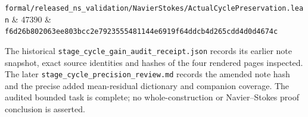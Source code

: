 \documentclass[10pt,a4paper]{article}
\begin{document}
{\begin{longtable}[]
\texttt{f\allowbreak{}o\allowbreak{}r\allowbreak{}m\allowbreak{}a\allowbreak{}l\allowbreak{}/\allowbreak{}r\allowbreak{}e\allowbreak{}l\allowbreak{}e\allowbreak{}a\allowbreak{}s\allowbreak{}e\allowbreak{}d\allowbreak{}\_\allowbreak{}n\allowbreak{}s\allowbreak{}\_\allowbreak{}v\allowbreak{}a\allowbreak{}l\allowbreak{}i\allowbreak{}d\allowbreak{}a\allowbreak{}t\allowbreak{}i\allowbreak{}o\allowbreak{}n\allowbreak{}/\allowbreak{}N\allowbreak{}a\allowbreak{}v\allowbreak{}i\allowbreak{}e\allowbreak{}r\allowbreak{}S\allowbreak{}t\allowbreak{}o\allowbreak{}k\allowbreak{}e\allowbreak{}s\allowbreak{}/\allowbreak{}A\allowbreak{}c\allowbreak{}t\allowbreak{}u\allowbreak{}a\allowbreak{}l\allowbreak{}C\allowbreak{}y\allowbreak{}c\allowbreak{}l\allowbreak{}e\allowbreak{}P\allowbreak{}r\allowbreak{}e\allowbreak{}s\allowbreak{}e\allowbreak{}r\allowbreak{}v\allowbreak{}a\allowbreak{}t\allowbreak{}i\allowbreak{}o\allowbreak{}n\allowbreak{}.\allowbreak{}l\allowbreak{}e\allowbreak{}a\allowbreak{}n} & {}47390 & \texttt{f\allowbreak{}6\allowbreak{}d\allowbreak{}2\allowbreak{}6\allowbreak{}b\allowbreak{}8\allowbreak{}0\allowbreak{}2\allowbreak{}0\allowbreak{}6\allowbreak{}3\allowbreak{}e\allowbreak{}e\allowbreak{}8\allowbreak{}0\allowbreak{}3\allowbreak{}b\allowbreak{}c\allowbreak{}c\allowbreak{}2\allowbreak{}e\allowbreak{}7\allowbreak{}9\allowbreak{}2\allowbreak{}3\allowbreak{}5\allowbreak{}5\allowbreak{}5\allowbreak{}4\allowbreak{}8\allowbreak{}1\allowbreak{}1\allowbreak{}4\allowbreak{}4\allowbreak{}e\allowbreak{}6\allowbreak{}9\allowbreak{}1\allowbreak{}9\allowbreak{}f\allowbreak{}6\allowbreak{}4\allowbreak{}d\allowbreak{}d\allowbreak{}c\allowbreak{}b\allowbreak{}4\allowbreak{}d\allowbreak{}2\allowbreak{}6\allowbreak{}5\allowbreak{}c\allowbreak{}d\allowbreak{}d\allowbreak{}4\allowbreak{}d\allowbreak{}0\allowbreak{}d\allowbreak{}4\allowbreak{}6\allowbreak{}7\allowbreak{}4\allowbreak{}c} \\
\end{longtable}
}

The historical \texttt{s\allowbreak{}t\allowbreak{}a\allowbreak{}g\allowbreak{}e\allowbreak{}\_\allowbreak{}c\allowbreak{}y\allowbreak{}c\allowbreak{}l\allowbreak{}e\allowbreak{}\_\allowbreak{}g\allowbreak{}a\allowbreak{}i\allowbreak{}n\allowbreak{}\_\allowbreak{}a\allowbreak{}u\allowbreak{}d\allowbreak{}i\allowbreak{}t\allowbreak{}\_\allowbreak{}r\allowbreak{}e\allowbreak{}c\allowbreak{}e\allowbreak{}i\allowbreak{}p\allowbreak{}t\allowbreak{}.\allowbreak{}j\allowbreak{}s\allowbreak{}o\allowbreak{}n} records its earlier note snapshot, exact source identities and hashes of the four rendered pages inspected. The later \texttt{s\allowbreak{}t\allowbreak{}a\allowbreak{}g\allowbreak{}e\allowbreak{}\_\allowbreak{}c\allowbreak{}y\allowbreak{}c\allowbreak{}l\allowbreak{}e\allowbreak{}\_\allowbreak{}p\allowbreak{}r\allowbreak{}e\allowbreak{}c\allowbreak{}i\allowbreak{}s\allowbreak{}i\allowbreak{}o\allowbreak{}n\allowbreak{}\_\allowbreak{}r\allowbreak{}e\allowbreak{}v\allowbreak{}i\allowbreak{}e\allowbreak{}w\allowbreak{}.\allowbreak{}m\allowbreak{}d} records the amended note hash and the precise added mean-residual dictionary and companion coverage. The audited bounded task is complete; no whole-construction or Navier--Stokes proof conclusion is asserted.
\end{document}
